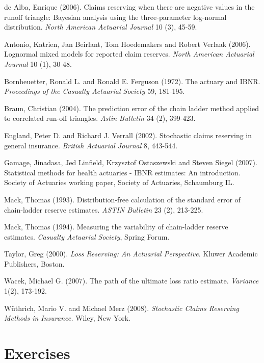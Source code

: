 \begin{multicols}{2}


de Alba, Enrique (2006). Claims reserving when there are negative
values in the runoff triangle: Bayesian analysis using the
three-parameter log-normal distribution. \emph{North American
Actuarial Journal} 10 (3), 45-59.

Antonio, Katrien, Jan Beirlant, Tom Hoedemakers and Robert Verlaak
(2006). Lognormal mixed models for reported claim reserves.
\emph{North American Actuarial Journal} 10 (1), 30-48.

Bornheuetter, Ronald L. and Ronald E. Ferguson (1972). The actuary
and IBNR. \emph{Proceedings of the Casualty Actuarial Society} 59,
181-195.

Braun, Christian (2004). The prediction error of the chain ladder
method applied to correlated run-off triangles. \textit{Astin
Bulletin} 34 (2), 399-423.

England, Peter D. and Richard J. Verrall (2002). Stochastic claims
reserving in general insurance. \emph{British Actuarial Journal} 8,
443-544.

Gamage, Jinadasa, Jed Linfield, Krzysztof Ostaszewski and Steven
Siegel (2007). Statistical methods for health actuaries - IBNR
estimates: An introduction. Society of Actuaries working paper,
Society of Actuaries, Schaumburg IL.

Mack, Thomas (1993). Distribution-free calculation of the standard
error of chain-ladder reserve estimates. \emph{ASTIN Bulletin} 23
(2), 213-225.

Mack, Thomas (1994). Measuring the variability of chain-ladder
reserve estimates. \emph{Casualty Actuarial Society}, Spring Forum.

Taylor, Greg (2000). \emph{Loss Reserving: An Actuarial
Perspective}. Kluwer Academic Publishers, Boston.

Wacek, Michael G. (2007). The path of the ultimate loss ratio
estimate. \textit{Variance} 1(2), 173-192.

W\"{u}thrich, Mario V. and Michael Merz (2008). \emph{Stochastic
Claims Reserving Methods in Insurance.} Wiley, New York.


\end{multicols}


\bigskip

\section{Exercises}

